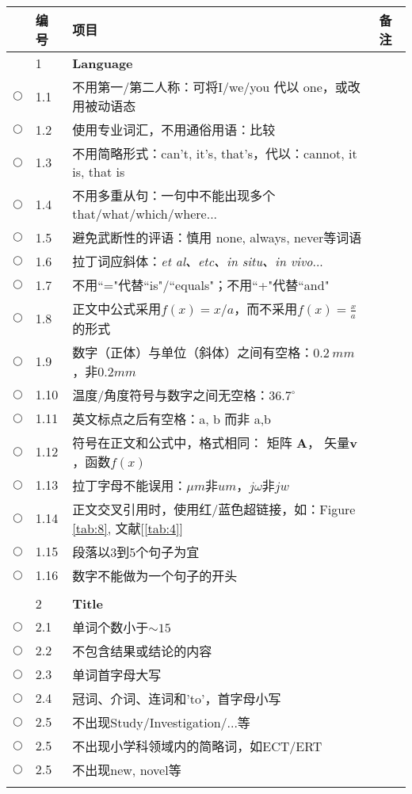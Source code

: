 \documentclass{ctexart}
\begin{document}
\begin{table}[h]
\centering
\begin{tabular}{|c|l|l|l|}
\hline
& 编号 & 项目& 备注\\ \hline
 & 1 & \textcolor[rgb]{0.00,0.00,1.00}{\textbf{Language}}&\\\hline
$\bigcirc$& 1.1 & 不用第一/第二人称：可将I/we/you 代以 one，或改用被动语态 &\\\hline
$\bigcirc$& 1.2 & 使用专业词汇，不用通俗用语：比较 &\\\hline
$\bigcirc$& 1.3 & 不用简略形式：can't, it's, that's，代以：cannot, it is, that is &\\\hline
$\bigcirc$& 1.4 & 不用多重从句：一句中不能出现多个that/what/which/where...&\\\hline
$\bigcirc$& 1.5 & 避免武断性的评语：慎用 none, always, never等词语 &\\\hline
$\bigcirc$& 1.6 & 拉丁词应斜体：\emph{et al、etc、in situ、in vivo}...&\\\hline
$\bigcirc$& 1.7 & 不用``="代替``is"/``equals"；不用``+"代替``and"&\\\hline
$\bigcirc$& 1.8 & 正文中公式采用$f(x)=x/a$，而不采用$f(x)=\frac{x}{a}$ 的形式&\\\hline
$\bigcirc$& 1.9 & 数字（正体）与单位（斜体）之间有空格：$0.2~mm$，非$0.2mm$ &\\\hline
$\bigcirc$& 1.10 & 温度/角度符号与数字之间无空格：$36.7^\circ$ &\\\hline
$\bigcirc$& 1.11 & 英文标点之后有空格：a, b 而非  a,b &\\\hline
$\bigcirc$& 1.12 & 符号在正文和公式中，格式相同： 矩阵 $\mathbf{A}$， 矢量$\mathbf{v}$，函数$f(x)$&\\\hline
$\bigcirc$& 1.13 & 拉丁字母不能误用：$\mu m$非$um$，$j\omega$非$jw$ &\\\hline
$\bigcirc$& 1.14 & 正文交叉引用时，使用红/蓝色超链接，如：Figure \ref{tab:8}, 文献[\ref{tab:4}] &\\\hline
$\bigcirc$& 1.15 & 段落以3到5个句子为宜 &\\\hline
$\bigcirc$& 1.16 & 数字不能做为一个句子的开头 &\\\hline
$ $&  &  &\\\hline

 & 2 & \textcolor[rgb]{0.00,0.00,1.00}{\textbf{Title}}&\\\hline
$\bigcirc$ & 2.1 & 单词个数小于$\sim 15$&\\\hline
$\bigcirc$ & 2.2 & 不包含结果或结论的内容 &\\\hline
$\bigcirc$ & 2.3 & 单词首字母大写&\\\hline
$\bigcirc$ & 2.4 & 冠词、介词、连词和'to'，首字母小写&\\\hline
$\bigcirc$ & 2.5 & 不出现Study/Investigation/...等&\\\hline
$\bigcirc$ & 2.5 & 不出现小学科领域内的简略词，如ECT/ERT&\\\hline
$\bigcirc$ & 2.5 & 不出现new, novel等&\\\hline
$ $&  &  &\\\hline



\end{tabular}
\end{table}
\end{document}
